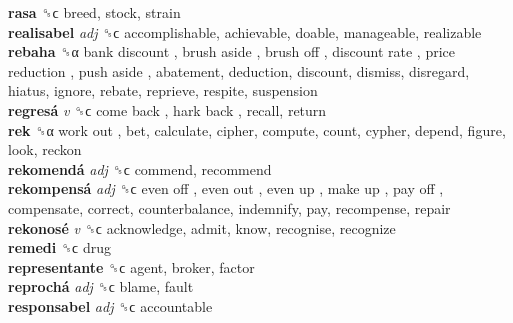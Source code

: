 \textbf{rasa} ␝ϲ  breed, stock, strain  \\
\textbf{realisabel} \emph{adj}  ␝ϲ  accomplishable, achievable, doable, manageable, realizable  \\
\textbf{rebaha} ␝α   bank discount ,  brush aside ,  brush off ,  discount rate ,  price reduction ,  push aside , abatement, deduction, discount, dismiss, disregard, hiatus, ignore, rebate, reprieve, respite, suspension  \\
\textbf{regresá} \emph{v}  ␝ϲ   come back ,  hark back , recall, return  \\
\textbf{rek} ␝α   work out , bet, calculate, cipher, compute, count, cypher, depend, figure, look, reckon  \\
\textbf{rekomendá} \emph{adj}  ␝ϲ  commend, recommend  \\
\textbf{rekompensá} \emph{adj}  ␝ϲ   even off ,  even out ,  even up ,  make up ,  pay off , compensate, correct, counterbalance, indemnify, pay, recompense, repair  \\
\textbf{rekonosé} \emph{v}  ␝ϲ  acknowledge, admit, know, recognise, recognize  \\
\textbf{remedi} ␝ϲ  drug  \\
\textbf{representante} ␝ϲ  agent, broker, factor  \\
\textbf{reprochá} \emph{adj}  ␝ϲ  blame, fault  \\
\textbf{responsabel} \emph{adj}  ␝ϲ  accountable  \\
